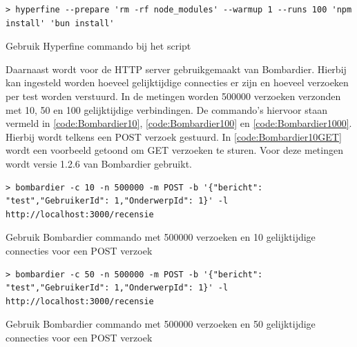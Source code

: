 \begin{listing}[H]
  \centering
  \begin{verbatim}
> hyperfine --prepare 'rm -rf node_modules' --warmup 1 --runs 100 'npm install' 'bun install'
      \end{verbatim}
      \caption{\label{code:HyperfineInstall}Gebruik Hyperfine commando bij het script}
\end{listing}
Daarnaast wordt voor de HTTP server gebruikgemaakt van Bombardier. 
Hierbij kan ingesteld worden hoeveel gelijktijdige connecties er zijn en hoeveel verzoeken per test worden verstuurd.
In de metingen worden 500000 verzoeken verzonden met 10, 50 en 100 gelijktijdige verbindingen.
De commando's hiervoor staan vermeld in \ref{code:Bombardier10}, \ref{code:Bombardier100} en \ref{code:Bombardier1000}.
Hierbij wordt telkens een POST verzoek gestuurd. In \ref{code:Bombardier10GET} wordt een voorbeeld getoond om GET verzoeken te sturen.
Voor deze metingen wordt versie 1.2.6 van Bombardier gebruikt.
\begin{listing}[H]
  \centering
  \begin{verbatim}
> bombardier -c 10 -n 500000 -m POST -b '{"bericht": "test","GebruikerId": 1,"OnderwerpId": 1}' -l http://localhost:3000/recensie
      \end{verbatim}
      \caption{\label{code:Bombardier10}Gebruik Bombardier commando met 500000 verzoeken en 10 gelijktijdige connecties voor een POST verzoek}
\end{listing}
\begin{listing}[H]
  \centering
  \begin{verbatim}
> bombardier -c 50 -n 500000 -m POST -b '{"bericht": "test","GebruikerId": 1,"OnderwerpId": 1}' -l http://localhost:3000/recensie
      \end{verbatim}
      \caption{\label{code:Bombardier100}Gebruik Bombardier commando met 500000 verzoeken en 50 gelijktijdige connecties voor een POST verzoek}
\end{listing}
